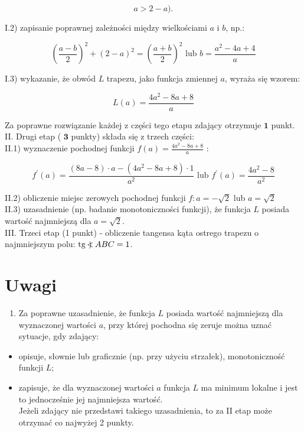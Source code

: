 \documentclass[10pt]{article}
\newcommand\Varangle{\mathop{{<\!\!\!\!\!\text{\small)}}\:}\nolimits}
\begin{document}
$$
a>2-a) .
$$

I.2) zapisanie poprawnej zależności między wielkościami $a$ i $b$, np.:

$$
\left(\frac{a-b}{2}\right)^{2}+(2-a)^{2}=\left(\frac{a+b}{2}\right)^{2} \text { lub } b=\frac{a^{2}-4 a+4}{a}
$$

I.3) wykazanie, że obwód $L$ trapezu, jako funkcja zmiennej $a$, wyraża się wzorem:

$$
L(a)=\frac{4 a^{2}-8 a+8}{a}
$$

Za poprawne rozwiązanie każdej z części tego etapu zdający otrzymuje $\mathbf{1}$ punkt.\\
II. Drugi etap ( $\mathbf{3}$ punkty) składa się z trzech części:\\
II.1) wyznaczenie pochodnej funkcji $f(a)=\frac{4 a^{2}-8 a+8}{a}$ :

$$
f^{\prime}(a)=\frac{(8 a-8) \cdot a-\left(4 a^{2}-8 a+8\right) \cdot 1}{a^{2}} \text { lub } f^{\prime}(a)=\frac{4 a^{2}-8}{a^{2}}
$$

II.2) obliczenie miejsc zerowych pochodnej funkcji $f: a=-\sqrt{2}$ lub $a=\sqrt{2}$\\
II.3) uzasadnienie (np. badanie monotoniczności funkcji), że funkcja $L$ posiada wartość najmniejszą dla $a=\sqrt{2}$.\\
III. Trzeci etap (1 punkt) - obliczenie tangensa kąta ostrego trapezu o najmniejszym polu: $\operatorname{tg} \Varangle A B C=1$.

\section*{Uwagi}
\begin{enumerate}
  \item Za poprawne uzasadnienie, że funkcja $L$ posiada wartość najmniejszą dla wyznaczonej wartości $a$, przy której pochodna się zeruje można uznać sytuacje, gdy zdający:
\end{enumerate}

\begin{itemize}
  \item opisuje, słownie lub graficznie (np. przy użyciu strzałek), monotoniczność funkcji $L$;
  \item zapisuje, że dla wyznaczonej wartości $a$ funkcja $L$ ma minimum lokalne i jest to jednocześnie jej najmniejsza wartość.\\
Jeżeli zdający nie przedstawi takiego uzasadnienia, to za II etap może otrzymać co najwyżej 2 punkty.
\end{itemize}
\end{document}
